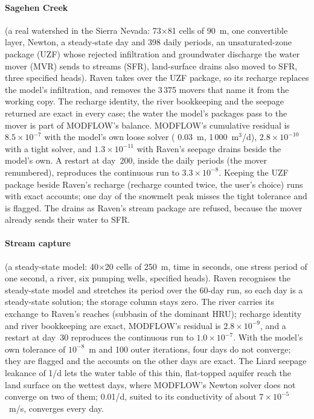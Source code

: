 \paragraph{Sagehen Creek} (a real watershed in the Sierra Nevada: 73$\times$81 cells of 90~m, one convertible layer,
Newton, a steady-state day and 398 daily periods, an unsaturated-zone package (UZF) whose rejected infiltration and
groundwater discharge the water mover (MVR) sends to streams (SFR), land-surface drains also moved to SFR, three specified
heads). Raven takes over the UZF package, so its recharge replaces the model's infiltration, and removes the 3\,375 movers
that name it from the working copy. The recharge identity, the river bookkeeping and the seepage returned are exact in every
case; the water the model's packages pass to the mover is part of MODFLOW's balance. MODFLOW's cumulative residual is
$8.5\times10^{-7}$ with the model's own loose solver ( 0.03~m,  1\,000~m$^3$/d),
$2.8\times10^{-10}$ with a tight solver, and $1.3\times10^{-11}$ with Raven's seepage drains beside the model's own. A
restart at day~200, inside the daily periods (the mover renumbered), reproduces the continuous run to $3.3\times10^{-8}$.
Keeping the UZF package beside Raven's recharge (recharge counted twice, the user's choice) runs with exact accounts; one
day of the snowmelt peak misses the tight tolerance and is flagged. The drains as Raven's stream package are refused,
because the mover already sends their water to SFR.

\paragraph{Stream capture} (a steady-state model: 40$\times$20 cells of 250~m, time in seconds, one stress period of one
second, a river, six pumping wells, specified heads). Raven recognises the steady-state model and stretches its period over
the 60-day run, so each day is a steady-state solution; the storage column stays zero. The river carries its exchange to
Raven's reaches (subbasin of the dominant HRU); recharge identity and river bookkeeping are exact, MODFLOW's residual is
$2.8\times10^{-9}$, and a restart at day~30 reproduces the continuous run to $1.0\times10^{-7}$. With the model's own
tolerance of $10^{-8}$~m and 100 outer iterations, four days do not converge; they are flagged and the accounts on the
other days are exact. The Liard seepage leakance of 1/d lets the water table of this thin, flat-topped aquifer reach the land
surface on the wettest days, where MODFLOW's Newton solver does not converge on two of them; 0.01/d, suited to its
conductivity of about $7\times10^{-5}$~m/s, converges every day.

